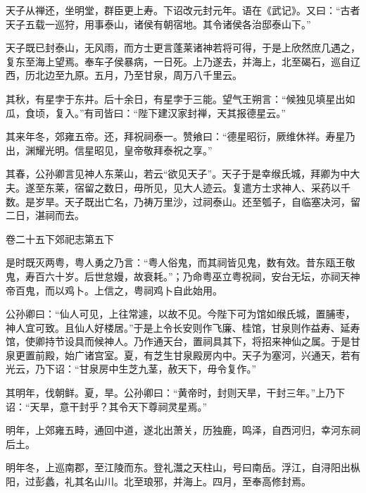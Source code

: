 \documentclass[12pt,UTF8]{ctexbook}
\begin{document}
天子从禅还，坐明堂，群臣更上寿。下诏改元封元年。语在《武记》。又曰：“古者天子五载一巡狩，用事泰山，诸侯有朝宿地。其令诸侯各治邸泰山下。”



天子既已封泰山，无风雨，而方士更言蓬莱诸神若将可得，于是上欣然庶几遇之，复东至海上望焉。奉车子侯暴病，一日死。上乃遂去，并海上，北至碣石，巡自辽西，历北边至九原。五月，乃至甘泉，周万八千里云。



其秋，有星孛于东井。后十余日，有星孛于三能。望气王朔言：“候独见填星出如瓜，食顷，复入。”有司皆曰：“陛下建汉家封禅，天其报德星云。”



其来年冬，郊雍五帝。还，拜祝祠泰一。赞飨曰：“德星昭衍，厥维休祥。寿星乃出，渊耀光明。信星昭见，皇帝敬拜泰祝之享。”



其春，公孙卿言见神人东莱山，若云“欲见天子”。天子于是幸缑氏城，拜卿为中大夫。遂至东莱，宿留之数日，毋所见，见大人迹云。复遣方士求神人、采药以千数。是岁旱。天子既出亡名，乃祷万里沙，过祠泰山。还至瓠子，自临塞决河，留二日，湛祠而去。





卷二十五下郊祀志第五下



是时既灭两粤，粤人勇之乃言：“粤人俗鬼，而其祠皆见鬼，数有效。昔东瓯王敬鬼，寿百六十岁。后世怠嫚，故衰耗。”；乃命粤巫立粤祝祠，安台无坛，亦祠天神帝百鬼，而以鸡卜。上信之，粤祠鸡卜自此始用。



公孙卿曰：“仙人可见，上往常遽，以故不见。今陛下可为馆如缑氏城，置脯枣，神人宜可致。且仙人好楼居。”于是上令长安则作飞廉、桂馆，甘泉则作益寿、延寿馆，使卿持节设具而候神人。乃作通天台，置祠具其下，将招来神仙之属。于是甘泉更置前殿，始广诸宫室。夏，有芝生甘泉殿房内中。天子为塞河，兴通天，若有光云，乃下诏：“甘泉房中生芝九茎，赦天下，毋令复作。”



其明年，伐朝鲜。夏，旱。公孙卿曰：“黄帝时，封则天旱，干封三年。”上乃下诏：“天旱，意干封乎？其令天下尊祠灵星焉。”



明年，上郊雍五畤，通回中道，遂北出萧关，历独鹿，鸣泽，自西河归，幸河东祠后土。



明年冬，上巡南郡，至江陵而东。登礼灊之天柱山，号曰南岳。浮江，自浔阳出枞阳，过彭蠡，礼其名山川。北至琅邪，并海上。四月，至奉高修封焉。
\end{document}
